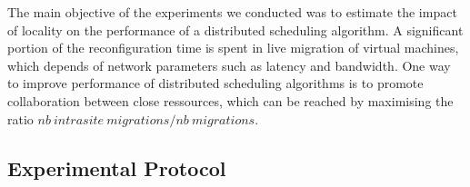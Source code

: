 
%
%
%




The main objective of the experiments we conducted was to estimate the impact of locality on
the performance of a distributed scheduling algorithm. A significant portion of the
reconfiguration time is spent in live migration of virtual machines, which depends of
network parameters such as latency and bandwidth. One way to improve performance of
distributed scheduling algorithms is to promote collaboration between close ressources,
which can be reached by maximising the ratio $nb\ intrasite\ migrations/nb\ migrations$.


\subsection{Experimental Protocol}

